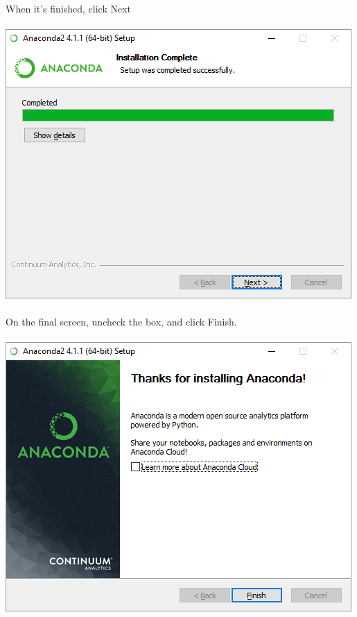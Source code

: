 \documentclass[]{article}
\begin{document}
\paragraph{}
When it's finished, click Next
\paragraph{}
\begin{centering}
    \centerline{\includegraphics[scale=0.7]{Screenshot_11.png}}
\end{centering}

\paragraph{}
On the final screen, uncheck the box, and click Finish.
\paragraph{}
\begin{centering}
    \centerline{\includegraphics[scale=0.7]{Screenshot_12.png}}
\end{centering}
\end{document}
